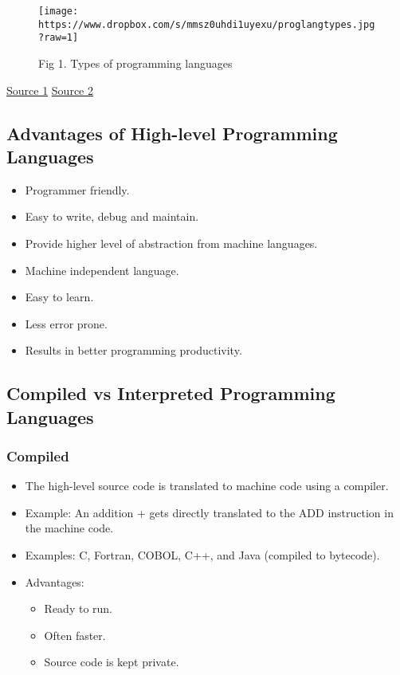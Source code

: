\documentclass[11pt]{article}
\makeatletter
\def\maxwidth{\ifdim\Gin@nat@width>\linewidth\linewidth
    \else\Gin@nat@width\fi}
\let\Oldincludegraphics\includegraphics
\renewcommand{\includegraphics}[1]{\Oldincludegraphics[width=.8\maxwidth]{#1}}
\providecommand{\tightlist}{%
      \setlength{\itemsep}{0pt}\setlength{\parskip}{0pt}}
\makeatother
\begin{document}
\begin{figure}
\centering
\texttt{[image: https://www.dropbox.com/s/mmsz0uhdi1uyexu/proglangtypes.jpg?raw=1]}
\caption{Fig 1. Types of programming languages}
\end{figure}

\href{http://4.bp.blogspot.com/-NvijJmjC13I/TmIbqlKKl8I/AAAAAAAAA3Q/mK4Nmy43en8/s1600/Untitled-1+\%25281\%2529.jpg}{Source
1}
\href{https://studyin24.com/wp-content/uploads/2018/12/Programming-language-types.jpg}{Source
2}

    \subsection{Advantages of High-level Programming
Languages}\label{advantages-of-high-level-programming-languages}

\begin{itemize}
\tightlist
\item
  Programmer friendly.
\item
  Easy to write, debug and maintain.
\item
  Provide higher level of abstraction from machine languages.
\item
  Machine independent language.
\item
  Easy to learn.
\item
  Less error prone.
\item
  Results in better programming productivity.
\end{itemize}

    \subsection{Compiled vs Interpreted Programming
Languages}\label{compiled-vs-interpreted-programming-languages}

    \subsubsection{Compiled}\label{compiled}

\begin{itemize}
\tightlist
\item
  The high-level source code is translated to machine code using a
  compiler.
\item
  Example: An addition + gets directly translated to the ADD instruction
  in the machine code.
\item
  Examples: C, Fortran, COBOL, C++, and Java (compiled to bytecode).
\item
  Advantages:

  \begin{itemize}
  \tightlist
  \item
    Ready to run.
  \item
    Often faster.
  \item
    Source code is kept private.
  \end{itemize}
\end{itemize}
\end{document}
